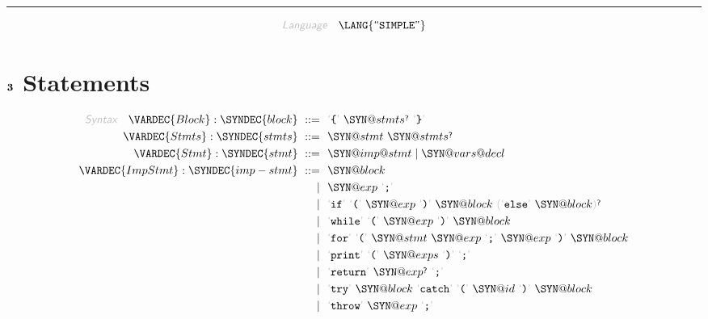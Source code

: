 

\begin{center}
\rule{3in}{0.4pt}
\end{center}

\begin{displaymath}
\KEY{Language} \quad \LANG{\STRING{SIMPLE}}
\end{displaymath}

\section{$\SECT{3}$ Statements}\hypertarget{SectionNumber:3}{}\label{SectionNumber:3}

\begin{align*}
  \KEY{Syntax} \quad
    \VARDEC{Block} : \SYNDEC{block}
      \ ::= \ & \
      \LEX{{\LEFTBRACE}} \ \SYN@stmts\QUERY \ \LEX{{\RIGHTBRACE}}
    \\
    \VARDEC{Stmts} : \SYNDEC{stmts}
      \ ::= \ & \
      \SYN@stmt \ \SYN@stmts\QUERY
    \\
    \VARDEC{Stmt} : \SYNDEC{stmt}
      \ ::= \ & \
      \SYN@imp@stmt \mid \SYN@vars@decl
    \\
    \VARDEC{ImpStmt} : \SYNDEC{imp-stmt}
      \ ::= \ & \
      \SYN@block \\
      \ \mid \ & \ \SYN@exp \ \LEX{{;}} \\
      \ \mid \ & \ \LEX{if} \ \LEX{{(}} \ \SYN@exp \ \LEX{{)}} \ \SYN@block \ \LEFTGROUP \LEX{else} \ \SYN@block \RIGHTGROUP\QUERY \\
      \ \mid \ & \ \LEX{while} \ \LEX{{(}} \ \SYN@exp \ \LEX{{)}} \ \SYN@block \\
      \ \mid \ & \ \LEX{for} \ \LEX{{(}} \ \SYN@stmt \ \SYN@exp \ \LEX{{;}} \ \SYN@exp \ \LEX{{)}} \ \SYN@block \\
      \ \mid \ & \ \LEX{print} \ \LEX{{(}} \ \SYN@exps \ \LEX{{)}} \ \LEX{{;}} \\
      \ \mid \ & \ \LEX{return} \ \SYN@exp\QUERY \ \LEX{{;}} \\
      \ \mid \ & \ \LEX{try} \ \SYN@block \ \LEX{catch} \ \LEX{{(}} \ \SYN@id \ \LEX{{)}} \ \SYN@block \\
      \ \mid \ & \ \LEX{throw} \ \SYN@exp \ \LEX{{;}}
\end{align*}
